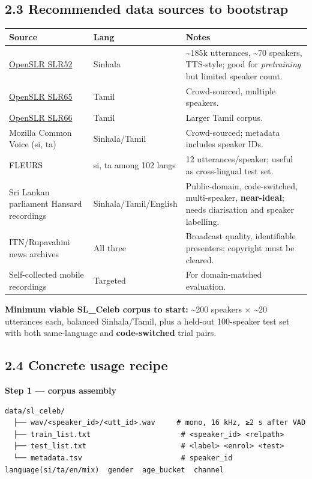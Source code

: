 \documentclass[10pt,a4paper]{article}
\renewcommand{\arraystretch}{1.15}
\begin{document}
\subsection*{2.3 Recommended data sources to bootstrap}
\begin{center}
\small
\renewcommand{\arraystretch}{1.25}
\begin{tabularx}{\textwidth}{|Y|Y|Y|}
\hline
Source & Lang & Notes \\
\hline
\href{https://www.openslr.org/52/}{OpenSLR SLR52} & Sinhala & \textasciitilde{}185k utterances, \textasciitilde{}70 speakers, TTS-style; good for \textit{pretraining} but limited speaker count. \\
\hline
\href{https://www.openslr.org/65/}{OpenSLR SLR65} & Tamil & Crowd-sourced, multiple speakers. \\
\hline
\href{https://www.openslr.org/66/}{OpenSLR SLR66} & Tamil & Larger Tamil corpus. \\
\hline
Mozilla Common Voice (si, ta) & Sinhala/Tamil & Crowd-sourced; metadata includes speaker IDs. \\
\hline
FLEURS & si, ta among 102 langs & 12 utterances/speaker; useful as cross-lingual test set. \\
\hline
Sri Lankan parliament Hansard recordings & Sinhala/Tamil/English & Public-domain, code-switched, multi-speaker, \textbf{near-ideal}; needs diarisation and speaker labelling. \\
\hline
ITN/Rupavahini news archives & All three & Broadcast quality, identifiable presenters; copyright must be cleared. \\
\hline
Self-collected mobile recordings & Targeted & For domain-matched evaluation. \\
\hline
\end{tabularx}
\end{center}

\textbf{Minimum viable SL\_Celeb corpus to start:} \textasciitilde{}200 speakers $\times$ \textasciitilde{}20 utterances each, balanced Sinhala/Tamil, plus a held-out 100-speaker test set with both same-language and \textbf{code-switched} trial pairs.

\subsection*{2.4 Concrete usage recipe}

\textbf{Step 1 --- corpus assembly}

\begin{Verbatim}[fontsize=\small,frame=single,framesep=4pt]
data/sl_celeb/
  ├── wav/<speaker_id>/<utt_id>.wav     # mono, 16 kHz, ≥2 s after VAD
  ├── train_list.txt                     # <speaker_id> <relpath>
  ├── test_list.txt                      # <label> <enrol> <test>
  └── metadata.tsv                       # speaker_id  language(si/ta/en/mix)  gender  age_bucket  channel
\end{Verbatim}
\end{document}
